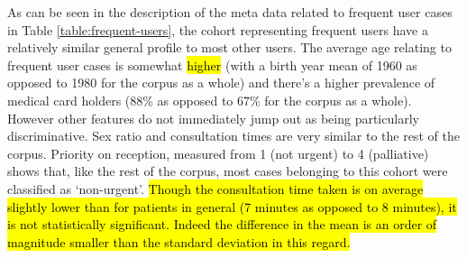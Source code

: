    
As can be seen in the description of the meta data related to frequent user cases in Table \ref{table:frequent-users}, the cohort representing frequent users have a relatively similar general profile to most other users. The average age relating to frequent user cases is somewhat \hl{higher} (with a birth year mean of 1960 as opposed to 1980 for the corpus as a whole) and there's a higher prevalence of medical card holders (88\% as opposed to 67\% for the corpus as a whole). However other features do not immediately jump out as being particularly discriminative. Sex ratio and consultation times are very similar to the rest of the corpus. Priority on reception, measured from 1 (not urgent) to 4 (palliative) shows that, like the rest of the corpus, most cases belonging to this cohort were classified as `non-urgent'. \hl{Though the consultation time taken is on average slightly lower than for patients in general (7 minutes as opposed to 8 minutes), it is not statistically significant. Indeed the difference in the mean is an order of magnitude smaller than the standard deviation in this regard.}       
   
   
   

